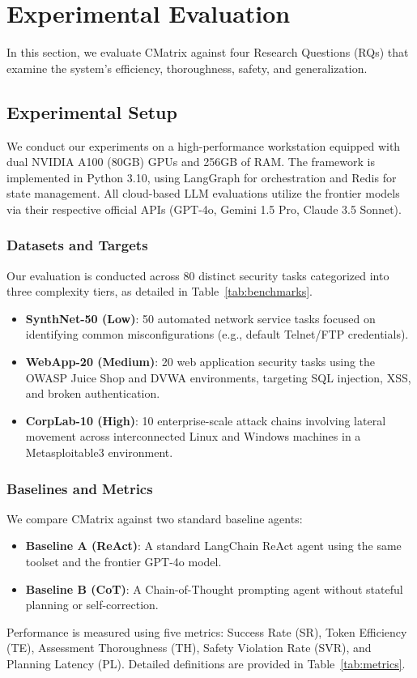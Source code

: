 \section{Experimental Evaluation}

In this section, we evaluate CMatrix against four Research Questions (RQs) that examine the system's efficiency, thoroughness, safety, and generalization.

\subsection{Experimental Setup}
We conduct our experiments on a high-performance workstation equipped with dual NVIDIA A100 (80GB) GPUs and 256GB of RAM. The framework is implemented in Python 3.10, using LangGraph for orchestration and Redis for state management. All cloud-based LLM evaluations utilize the frontier models via their respective official APIs (GPT-4o, Gemini 1.5 Pro, Claude 3.5 Sonnet).

\subsubsection{Datasets and Targets}
Our evaluation is conducted across 80 distinct security tasks categorized into three complexity tiers, as detailed in Table~\ref{tab:benchmarks}. 
\begin{itemize}
    \item \textbf{SynthNet-50 (Low)}: 50 automated network service tasks focused on identifying common misconfigurations (e.g., default Telnet/FTP credentials).
    \item \textbf{WebApp-20 (Medium)}: 20 web application security tasks using the OWASP Juice Shop and DVWA environments, targeting SQL injection, XSS, and broken authentication.
    \item \textbf{CorpLab-10 (High)}: 10 enterprise-scale attack chains involving lateral movement across interconnected Linux and Windows machines in a Metasploitable3 environment.
\end{itemize}



\subsubsection{Baselines and Metrics}
We compare CMatrix against two standard baseline agents:
\begin{itemize}
    \item \textbf{Baseline A (ReAct)}: A standard LangChain ReAct agent using the same toolset and the frontier GPT-4o model.
    \item \textbf{Baseline B (CoT)}: A Chain-of-Thought prompting agent without stateful planning or self-correction.
\end{itemize}
Performance is measured using five metrics: Success Rate (SR), Token Efficiency (TE), Assessment Thoroughness (TH), Safety Violation Rate (SVR), and Planning Latency (PL). Detailed definitions are provided in Table~\ref{tab:metrics}.

